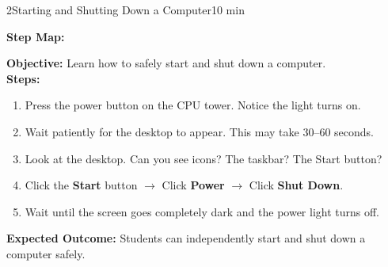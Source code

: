 
\begin{labactivity}{2}{Starting and Shutting Down a Computer}{10 min}


\textbf{Step Map:}
\begin{center}
\end{center}

\textbf{Objective:} Learn how to safely start and shut down a computer.\\[4pt]
\textbf{Steps:}
\begin{enumerate}[label=\protect\stepcircle{\arabic*}, leftmargin=2cm, itemsep=4pt]
  \item Press the power button on the CPU tower. Notice the light turns on.
  \item Wait patiently for the desktop to appear. This may take 30--60 seconds.
  \item Look at the desktop. Can you see icons? The taskbar? The Start button?
  \item Click the \textbf{Start} button $\rightarrow$ Click \textbf{Power} $\rightarrow$ Click \textbf{Shut Down}.
  \item Wait until the screen goes completely dark and the power light turns off.
\end{enumerate}
\textbf{Expected Outcome:} Students can independently start and shut down a computer safely.

\welldone
\end{labactivity}

